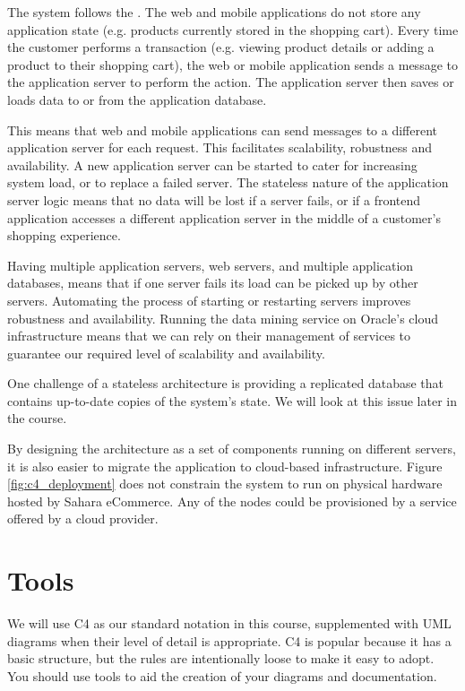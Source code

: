 \noindent
The system follows the .
The web and mobile applications do not store any application state (e.g. products currently stored in the shopping cart).
Every time the customer performs a transaction (e.g. viewing product details or adding a product to their shopping cart),
the web or mobile application sends a message to the application server to perform the action.
The application server then saves or loads data to or from the application database.

This means that web and mobile applications can send messages to a different application server for each request.
This facilitates scalability, robustness and availability.
A new application server can be started to cater for increasing system load, or to replace a failed server.
The stateless nature of the application server logic means that no data will be lost if a server fails,
or if a frontend application accesses a different application server in the middle of a customer's shopping experience.

Having multiple application servers, web servers, and multiple application databases,
means that if one server fails its load can be picked up by other servers.
Automating the process of starting or restarting servers improves robustness and availability.
Running the data mining service on Oracle's cloud infrastructure means that we can rely
on their management of services to guarantee our required level of scalability and availability.

One challenge of a stateless architecture is providing a replicated database that contains up-to-date copies of the system's state.
We will look at this issue later in the course.

By designing the architecture as a set of components running on different servers, it is also easier to migrate the application to cloud-based infrastructure.
Figure \ref{fig:c4_deployment} does not constrain the system to run on physical hardware hosted by Sahara eCommerce.
Any of the nodes could be provisioned by a service offered by a cloud provider.


\section{Tools}
We will use C4 as our standard notation in this course,
supplemented with UML diagrams when their level of detail is appropriate.
C4 is popular because it has a basic structure, but the rules are intentionally loose to make it easy to adopt.
You should use tools to aid the creation of your diagrams and documentation.

